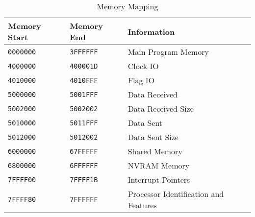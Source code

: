 \begin{table}[H]
\centering
\caption{Memory Mapping}
\begin{tabu} spread 0pt{ X[-2c]  X[-2c]  X[l] }
Memory Start & Memory End & Information \\
\hline
\texttt{0000000} & \texttt{3FFFFFF} & Main Program Memory \\
\texttt{4000000} & \texttt{400001D} & Clock IO \\
\texttt{4010000} & \texttt{4010FFF} & Flag IO \\
\texttt{5000000} & \texttt{5001FFF} & Data Received \\
\texttt{5002000} & \texttt{5002002} & Data Received Size \\
\texttt{5010000} & \texttt{5011FFF} & Data Sent \\
\texttt{5012000} & \texttt{5012002} & Data Sent Size \\
\texttt{6000000} & \texttt{67FFFFF} & Shared Memory \\
\texttt{6800000} & \texttt{6FFFFFF} & NVRAM Memory \\
\texttt{7FFFF00} & \texttt{7FFFF1B} & Interrupt Pointers \\
\texttt{7FFFF80} & \texttt{7FFFFFF} & Processor Identification and Features \\
\end{tabu}
\end{table}